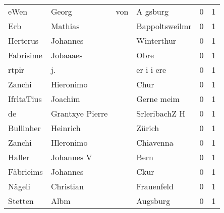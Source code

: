 \documentclass[10pt,a4paper,landscape]{article}
\begin{document}
\begin{longtable}{llllrr}
                     eWen &                              Georg &         von &                                    A gsburg &          0 &         1 \\
                      Erb &                            Mathias &             &                              Bappoltsweilmr &          0 &         1 \\
                 Herterus &                           Johannes &             &                                  Winterthur &          0 &         1 \\
                Fabrisime &                           Jobaaaes &             &                                        Obre &          0 &         1 \\
                    rtpir &                                 j. &             &                                  er i i ere &          0 &         1 \\
                   Zanchi &                          Hieronimo &             &                                        Chur &          0 &         1 \\
               IfrltaTius &                            Joachim &             &                                  Gerne meim &          0 &         1 \\
                       de &                    Grantxye Pierre &             &                               SrleribachZ H &          0 &         1 \\
                Bullinher &                           Heinrich &             &                                      Zürich &          0 &         1 \\
                   Zanchi &                          Hleronimo &             &                                   Chiavenna &          0 &         1 \\
                   Haller &                         Johannes V &             &                                        Bern &          0 &         1 \\
                Fäbrieims &                           Johannes &             &                                        Ckur &          0 &         1 \\
                   Nägeli &                          Christian &             &                                  Frauenfeld &          0 &         1 \\
                  Stetten &                               Albm &             &                                    Augsburg &          0 &         1 \\

\end{longtable}
\end{document}

